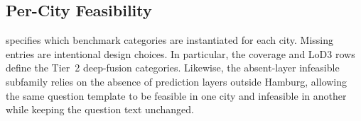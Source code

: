\documentclass[sigconf,authordraft]{acmart}
\begin{document}
\subsection{Per-City Feasibility}\label{app:questions_matrix}

 specifies which benchmark categories are instantiated for each city. Missing entries are intentional design choices.
In particular, the coverage and LoD3 rows define the Tier~2 deep-fusion categories. Likewise, the absent-layer infeasible subfamily relies on the absence of prediction layers outside Hamburg, allowing the same question template to be feasible in one city and infeasible in another while keeping the question text unchanged.
\end{document}
